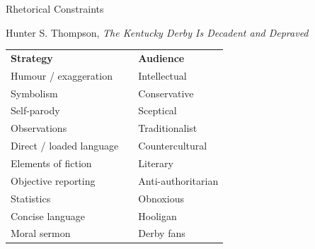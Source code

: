 \documentclass[11pt,a4paper]{article}
\begin{document}
{\headingfont\Huge\color{hgblue} Rhetorical Constraints}\par
{\large Hunter S. Thompson, \textit{The Kentucky Derby Is Decadent and Depraved}}\par

\vspace{2em}
\begin{tabularx}{\textwidth}{>{\raggedright\arraybackslash}p{}>{\centering\arraybackslash}p{}>{\raggedright\arraybackslash}p{}}
\rowcolor{hggrey}\textbf{Strategy} & & \textbf{Audience} \\
\vspace{0.25em}Humour / exaggeration & & \vspace{0.25em}Intellectual \\
\vspace{0.25em}Symbolism & & \vspace{0.25em}Conservative \\
\vspace{0.25em}Self-parody & & \vspace{0.25em}Sceptical \\
\vspace{0.25em}Observations & & \vspace{0.25em}Traditionalist \\
\vspace{0.25em}Direct / loaded language & & \vspace{0.25em}Countercultural \\
\vspace{0.25em}Elements of fiction & & \vspace{0.25em}Literary \\
\vspace{0.25em}Objective reporting & & \vspace{0.25em}Anti-authoritarian \\
\vspace{0.25em}Statistics & & \vspace{0.25em}Obnoxious \\
\vspace{0.25em}Concise language & & \vspace{0.25em}Hooligan \\
\vspace{0.25em}Moral sermon & & \vspace{0.25em}Derby fans \\
\end{tabularx}
\end{document}
